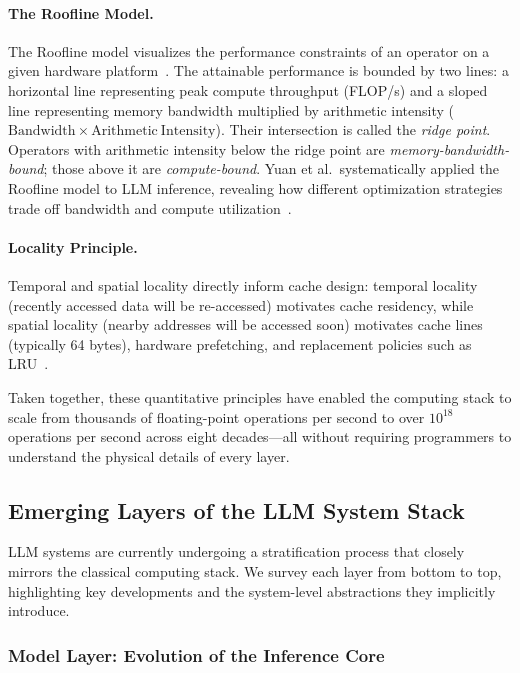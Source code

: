 \documentclass[11pt,a4paper]{article}
\begin{document}
\paragraph{The Roofline Model.}
The Roofline model visualizes the performance constraints of an operator on a given hardware platform~\cite{hennessy2017quantitative}.
The attainable performance is bounded by two lines: a horizontal line representing peak compute throughput (FLOP/s) and a sloped line representing memory bandwidth multiplied by arithmetic intensity ($\mathrm{Bandwidth} \times \mathrm{Arithmetic\ Intensity}$).
Their intersection is called the \emph{ridge point}.
Operators with arithmetic intensity below the ridge point are \emph{memory-bandwidth-bound}; those above it are \emph{compute-bound}.
Yuan et al.\ systematically applied the Roofline model to LLM inference, revealing how different optimization strategies trade off bandwidth and compute utilization~\cite{yuan2024llminference}.

\paragraph{Locality Principle.}
Temporal and spatial locality directly inform cache design: temporal locality (recently accessed data will be re-accessed) motivates cache residency, while spatial locality (nearby addresses will be accessed soon) motivates cache lines (typically 64 bytes), hardware prefetching, and replacement policies such as LRU~\cite{drepper2007memory}.

Taken together, these quantitative principles have enabled the computing stack to scale from thousands of floating-point operations per second to over $10^{18}$ operations per second across eight decades---all without requiring programmers to understand the physical details of every layer.

\subsection{Emerging Layers of the LLM System Stack}

LLM systems are currently undergoing a stratification process that closely mirrors the classical computing stack.
We survey each layer from bottom to top, highlighting key developments and the system-level abstractions they implicitly introduce.

\subsubsection{Model Layer: Evolution of the Inference Core}
\end{document}
